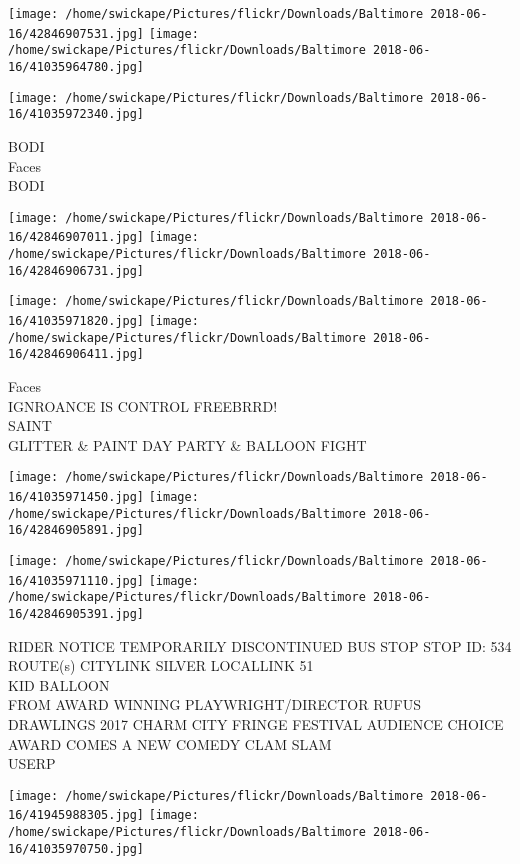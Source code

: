 \documentclass[10pt,letterpaper]{article}
\begin{document}
\texttt{[image: /home/swickape/Pictures/flickr/Downloads/Baltimore 2018-06-16/42846907531.jpg]}
\texttt{[image: /home/swickape/Pictures/flickr/Downloads/Baltimore 2018-06-16/41035964780.jpg]}

\vspace{0.25in}
\texttt{[image: /home/swickape/Pictures/flickr/Downloads/Baltimore 2018-06-16/41035972340.jpg]}

BODI\\
Faces\\
BODI\\
\pagebreak

\texttt{[image: /home/swickape/Pictures/flickr/Downloads/Baltimore 2018-06-16/42846907011.jpg]}
\texttt{[image: /home/swickape/Pictures/flickr/Downloads/Baltimore 2018-06-16/42846906731.jpg]}

\texttt{[image: /home/swickape/Pictures/flickr/Downloads/Baltimore 2018-06-16/41035971820.jpg]}
\texttt{[image: /home/swickape/Pictures/flickr/Downloads/Baltimore 2018-06-16/42846906411.jpg]}

Faces\\
IGNROANCE IS CONTROL FREEBRRD!\\
SAINT\\
GLITTER \& PAINT DAY PARTY \& BALLOON FIGHT\\
\pagebreak

\texttt{[image: /home/swickape/Pictures/flickr/Downloads/Baltimore 2018-06-16/41035971450.jpg]}
\texttt{[image: /home/swickape/Pictures/flickr/Downloads/Baltimore 2018-06-16/42846905891.jpg]}

\texttt{[image: /home/swickape/Pictures/flickr/Downloads/Baltimore 2018-06-16/41035971110.jpg]}
\texttt{[image: /home/swickape/Pictures/flickr/Downloads/Baltimore 2018-06-16/42846905391.jpg]}

RIDER NOTICE TEMPORARILY DISCONTINUED BUS STOP STOP ID: 534 ROUTE(s) CITYLINK SILVER LOCALLINK 51\\
KID BALLOON\\
FROM AWARD WINNING PLAYWRIGHT/DIRECTOR RUFUS DRAWLINGS 2017 CHARM CITY FRINGE FESTIVAL AUDIENCE CHOICE AWARD COMES A NEW COMEDY CLAM SLAM\\
USERP\\
\pagebreak

\texttt{[image: /home/swickape/Pictures/flickr/Downloads/Baltimore 2018-06-16/41945988305.jpg]}
\texttt{[image: /home/swickape/Pictures/flickr/Downloads/Baltimore 2018-06-16/41035970750.jpg]}
\end{document}
